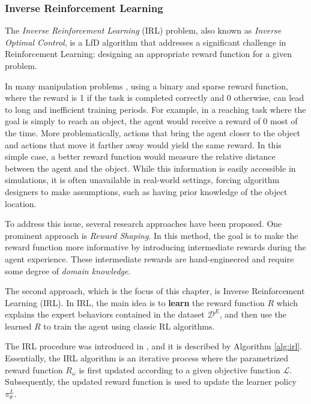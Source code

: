 \subsubsection{Inverse Reinforcement Learning}
\label{sec:irl}
The \textit{Inverse Reinforcement Learning} (IRL) problem, also known as \textit{Inverse Optimal Control}, is a LfD algorithm that addresses a significant challenge in Reinforcement Learning: designing an appropriate reward function for a given problem.

In many manipulation problems \cite{kalashnikov2018scalable}, using a binary and sparse reward function, where the reward is 1 if the task is completed correctly and 0 otherwise, can lead to long and inefficient training periods. For example, in a reaching task where the goal is simply to reach an object, the agent would receive a reward of 0 most of the time. More problematically, actions that bring the agent closer to the object and actions that move it farther away would yield the same reward. In this simple case, a better reward function would measure the relative distance between the agent and the object. While this information is easily accessible in simulations, it is often unavailable in real-world settings, forcing algorithm designers to make assumptions, such as having prior knowledge of the object location.


To address this issue, several research approaches have been proposed. One prominent approach is \textit{Reward Shaping}. In this method, the goal is to make the reward function more informative by introducing intermediate rewards during the agent experience. These intermediate rewards are hand-engineered and require some degree of \textit{domain knowledge}.

The second approach, which is the focus of this chapter, is Inverse Reinforcement Learning (IRL). In IRL, the main idea is to \textbf{learn} the reward function $R$ which explains the expert behaviors contained in the dataset $\mathcal{D}^{E}$, and then use the learned $R$ to train the agent using classic RL algorithms.

The IRL procedure was introduced in \cite{abbeel2004apprenticeship}, and it is described by Algorithm \ref{alg:irl}. Essentially, the IRL algorithm is an iterative process where the parametrized reward function $R_{\omega}$ is first updated according to a given objective function $\mathcal{L}$. Subsequently, the updated reward function is used to update the learner policy $\pi_{\theta}^{L}$.



